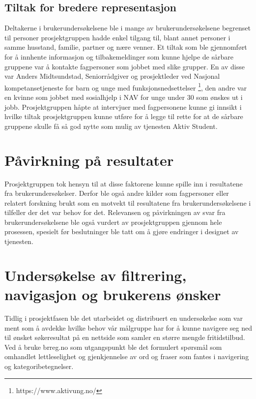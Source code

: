 \subsection{Tiltak for bredere representasjon}
Deltakerne i brukerundersøkelsene ble i mange av brukerundersøkelsene begrenset til personer prosjektgruppen hadde enkel tilgang til, blant annet personer i samme husstand, familie, partner og nære venner. Et tiltak som ble gjennomført for å innhente informasjon og tilbakemeldinger som kunne hjelpe de sårbare gruppene var å kontakte fagpersoner som jobbet med slike grupper. En av disse var Anders Midtsundstad, Seniorrådgiver og prosjektleder ved Nasjonal kompetansetjeneste for barn og unge med funksjonsnedsettelser \footnote{https://www.aktivung.no/}, den andre var en kvinne som jobbet med sosialhjelp i NAV for unge under 30 som ønskes ut i jobb. Prosjektgruppen håpte at intervjuer med fagpersonene kunne gi innsikt i hvilke tiltak prosjektgruppen kunne utføre for å legge til rette for at de sårbare gruppene skulle få så god nytte som mulig av tjenesten Aktiv Student.

\section{Påvirkning på resultater}
Prosjektgruppen tok hensyn til at disse faktorene kunne spille inn i resultatene fra brukerundersøkelser. Derfor ble også andre kilder som fagpersoner eller relatert forskning brukt som en motvekt til resultatene fra brukerundersøkelsene i tilfeller der det var behov for det. Relevansen og påvirkningen av svar fra brukerundersøkelsene ble også vurdert av prosjektgruppen gjennom hele prosessen, spesielt før beslutninger ble tatt om å gjøre endringer i designet av tjenesten.

\section{Undersøkelse av filtrering, navigasjon og brukerens ønsker}
\label{section:google-forms-test}
Tidlig i prosjektfasen ble det utarbeidet og distribuert en undersøkelse som var ment som å avdekke hvilke behov vår målgruppe har for å kunne navigere seg ned til ønsket søkeresultat på en nettside som samler en større mengde fritidstilbud.
Ved å bruke brreg.no som utgangspunkt ble det formulert spørsmål som omhandlet lettleselighet og gjenkjennelse av ord og fraser som fantes i navigering og kategoribetegnelser.

